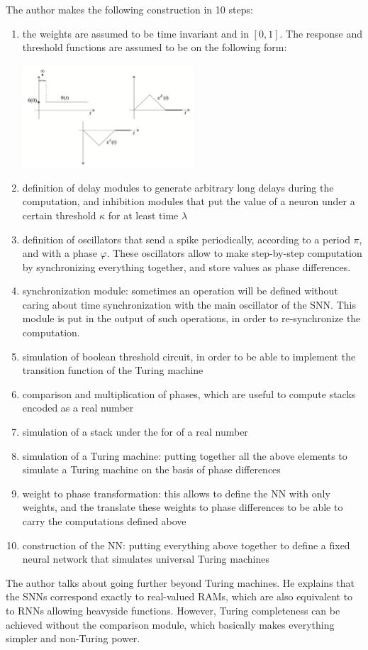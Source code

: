 \documentclass{article}
\begin{document}
The author makes the following construction in 10 steps:
 \begin{enumerate}
    \item the weights are assumed to be time invariant and in $[0,1]$. The response and threshold functions are assumed to be on the following form:
    \begin{center}
        \includegraphics[width=0.5\textwidth]{response_threshold_functions.png}
    \end{center}
    \item definition of delay modules to generate arbitrary long delays during the computation, and inhibition modules that put the value of a neuron under a certain threshold $\kappa$ for at least time $\lambda$
    \item definition of oscillators that send a spike periodically, according to a period $\pi$, and with a phase $\varphi$. These oscillators allow to make step-by-step computation by synchronizing everything together, and store values as phase differences.
    \item synchronization module: sometimes an operation will be defined without caring about time synchronization with the main oscillator of the SNN. This module is put in the output of such operations, in order to re-synchronize the computation.
    \item simulation of boolean threshold circuit, in order to be able to implement the transition function of the Turing machine
    \item comparison and multiplication of phases, which are useful to compute stacks encoded as a real number
    \item simulation of a stack under the for of a real number
    \item simulation of a Turing machine: putting together all the above elements to simulate a Turing machine on the basis of phase differences
    \item weight to phase transformation: this allows to define the NN with only weights, and the translate these weights to phase differences to be able to carry the computations defined above
    \item construction of the NN: putting everything above together to define a fixed neural network that simulates universal Turing machines
 \end{enumerate}

 The author talks about going further beyond Turing machines. He explains that the SNNs correspond exactly to real-valued RAMs, which are also equivalent to to RNNs allowing heavyside functions. However, Turing completeness can be achieved without the comparison module, which basically makes everything simpler and non-Turing power.
\end{document}
